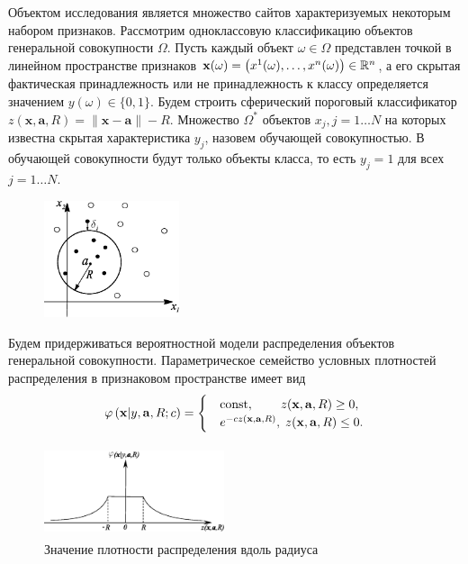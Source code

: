 Объектом исследования является множество сайтов характеризуемых некоторым набором признаков.
Рассмотрим одноклассовую классификацию объектов генеральной совокупности $\Omega$.
Пусть каждый объект $\omega \in{\Omega}$  представлен точкой в линейном пространстве признаков
$\mathbf{x}(\omega)=\left(x^1(\omega),\ldots, x^n(\omega)\right) \in {\mathbb{R}^n}$,
а его скрытая фактическая принадлежность или не принадлежность к классу
определяется значением $y(\omega)\in{\{0,1\}}$. Будем строить сферический пороговый классификатор
$z(\mathbf{x},\mathbf{a},R)=\left\|\mathbf{x}-\mathbf{a}\right\|-R$. Множество $\Omega^*$ объектов 
$x_j, j=1 \ldots N$ на которых известна скрытая характеристика $y_j$, назовем обучающей совокупностью. 
В обучающей совокупности будут только объекты класса, то есть $y_j=1$ для всех $j=1\ldots N$.

\begin{figure}[H]
\includegraphics[width=150px, height=130px]{fig1.eps}
\end{figure}

Будем придерживаться вероятностной модели распределения объектов генеральной совокупности. 
Параметрическое семейство условных плотностей распределения в признаковом пространстве имеет вид 
\begin{equation}
\label{prob1}
	\varphi \cbr{ {\mathbf x | y,\mathbf{a},R;c} } =
	\begcas{
		&\text{const},		\qquad\,					z(\mathbf{x},\mathbf{a},R) \geq 0, \\
		&e^{-c z(\mathbf{x},\mathbf{a},R)},\;	z(\mathbf{x},\mathbf{a},R) \leq 0.
	} 
\vspace{-5pt}
\end{equation}

\begin{figure}[H]
\includegraphics[width=200px, height=100px]{fig2.eps}
\caption{Значение плотности распределения вдоль радиуса}
\end{figure}

